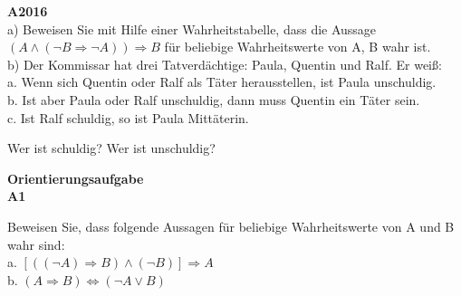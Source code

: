 \documentclass[landscape,twocolumn,a4paper]{article}
\begin{document}
\newpage

\textbf{A2016} \\

a) Beweisen Sie mit Hilfe einer Wahrheitstabelle, dass die Aussage
$(A \land ( \lnot B \Rightarrow \lnot A)) \Rightarrow B$
für beliebige Wahrheitswerte von A, B wahr ist. \\

b) Der Kommissar hat drei Tatverdächtige: Paula, Quentin und Ralf. Er weiß: \\
a. Wenn sich Quentin oder Ralf als Täter herausstellen, ist Paula unschuldig. \\
b. Ist aber Paula oder Ralf unschuldig, dann muss Quentin ein Täter sein. \\
c. Ist Ralf schuldig, so ist Paula Mittäterin.

Wer ist schuldig? Wer ist unschuldig?
\bigskip

\textbf{Orientierungsaufgabe} \\

\textbf{A1}

Beweisen Sie, dass folgende Aussagen für beliebige Wahrheitswerte von A und B wahr sind: \\

a. $[((\lnot A) \Rightarrow B) \land (\lnot B)] \Rightarrow A$ \\
b. $(A \Rightarrow B) \Leftrightarrow (\lnot A \lor B)$
\end{document}
